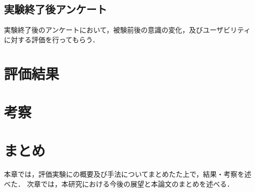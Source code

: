 \subsection{実験終了後アンケート}
実験終了後のアンケートにおいて，被験前後の意識の変化，及びユーザビリティに対する評価を行ってもらう．%

\section{評価結果}

\section{考察}

\section{まとめ}
本章では，評価実験にの概要及び手法についてまとめたた上で，結果・考察を述べた．
次章では，本研究における今後の展望と本論文のまとめを述べる．
